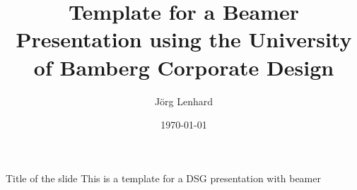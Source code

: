 \documentclass{beamer}
\title[DSG Template]{Template for a Beamer Presentation using the University of Bamberg Corporate Design}
\author{J\"org Lenhard}
\institute{Distributed Systems Group - WIAI - University of Bamberg}
\date{\today}
\begin{document}
 \begin{frame}[plain]
	\titlepage
\end{frame}

\begin{frame}{Title of the slide}
This is a template for a DSG presentation with beamer
\end{frame}
\end{document}
